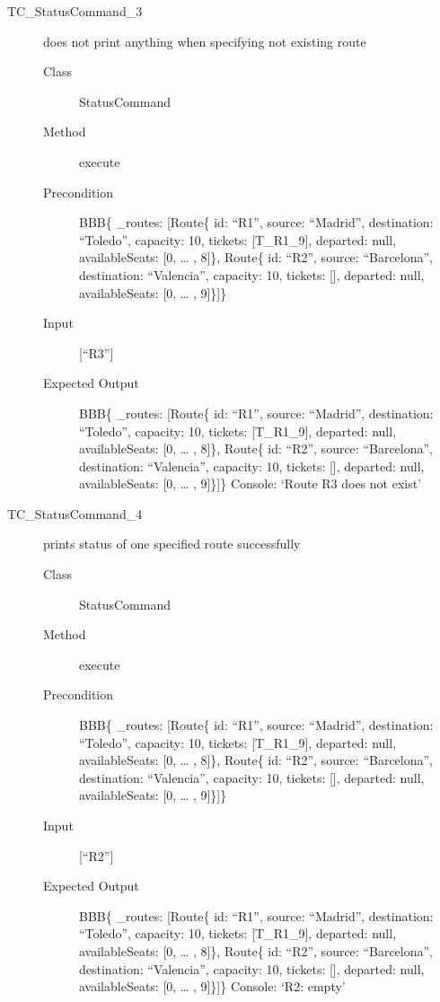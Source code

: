 \documentclass[11pt]{article}
\begin{document}
\begin{description}
\item[{TC\_StatusCommand\_3}] does not print anything when specifying not existing route
\begin{description}
\item[{Class}] StatusCommand
\item[{Method}] execute
\item[{Precondition}] BBB\{ \_routes: [Route\{ id: “R1”, source: “Madrid”, destination: “Toledo”, capacity: 10,  tickets: [T\_R1\_9], departed: null, availableSeats: [0, … , 8]\}, Route\{ id: “R2”, source: “Barcelona”, destination: “Valencia”, capacity: 10,  tickets: [], departed: null, availableSeats: [0, … , 9]\}]\}
\item[{Input}] [“R3”]
\item[{Expected Output}] BBB\{ \_routes: [Route\{ id: “R1”, source: “Madrid”, destination: “Toledo”, capacity: 10,  tickets: [T\_R1\_9], departed: null, availableSeats: [0, … , 8]\}, Route\{ id: “R2”, source: “Barcelona”, destination: “Valencia”, capacity: 10,  tickets: [], departed: null, availableSeats: [0, … , 9]\}]\}
Console: ‘Route R3 does not exist’
\end{description}

\item[{TC\_StatusCommand\_4}] prints status of one specified route successfully
\begin{description}
\item[{Class}] StatusCommand
\item[{Method}] execute
\item[{Precondition}] BBB\{ \_routes: [Route\{ id: “R1”, source: “Madrid”, destination: “Toledo”, capacity: 10,  tickets: [T\_R1\_9], departed: null, availableSeats: [0, … , 8]\}, Route\{ id: “R2”, source: “Barcelona”, destination: “Valencia”, capacity: 10,  tickets: [], departed: null, availableSeats: [0, … , 9]\}]\}
\item[{Input}] [“R2”]
\item[{Expected Output}] BBB\{ \_routes: [Route\{ id: “R1”, source: “Madrid”, destination: “Toledo”, capacity: 10,  tickets: [T\_R1\_9], departed: null, availableSeats: [0, … , 8]\}, Route\{ id: “R2”, source: “Barcelona”, destination: “Valencia”, capacity: 10,  tickets: [], departed: null, availableSeats: [0, … , 9]\}]\}
Console: ‘R2: empty’
\end{description}


\end{description}
\end{document}
